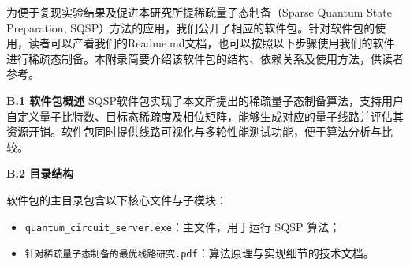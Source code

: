 \documentclass[10.5pt,compsoc,UTF8]{CjC}
\theoremstyle{mystyle}
\begin{document}







\vspace {10mm}

\newpage

\vspace {5mm}




为便于复现实验结果及促进本研究所提稀疏量子态制备（Sparse Quantum State Preparation, SQSP）方法的应用，我们公开了相应的软件包。针对软件包的使用，读者可以产看我们的Readme.md文档，也可以按照以下步骤使用我们的软件进行稀疏态制备。本附录简要介绍该软件包的结构、依赖关系及使用方法，供读者参考。

\textbf{B.1 软件包概述}
SQSP软件包实现了本文所提出的稀疏量子态制备算法，支持用户自定义量子比特数、目标态稀疏度及相位矩阵，能够生成对应的量子线路并评估其资源开销。软件包同时提供线路可视化与多轮性能测试功能，便于算法分析与比较。

\textbf{B.2 目录结构}

软件包的主目录包含以下核心文件与子模块：

\begin{itemize}[noitemsep,nolistsep]
  \item \verb|quantum_circuit_server.exe|：主文件，用于运行 SQSP 算法；
  \item \verb|针对稀疏量子态制备的最优线路研究.pdf|：算法原理与实现细节的技术文档。
\end{itemize}
\end{document}
